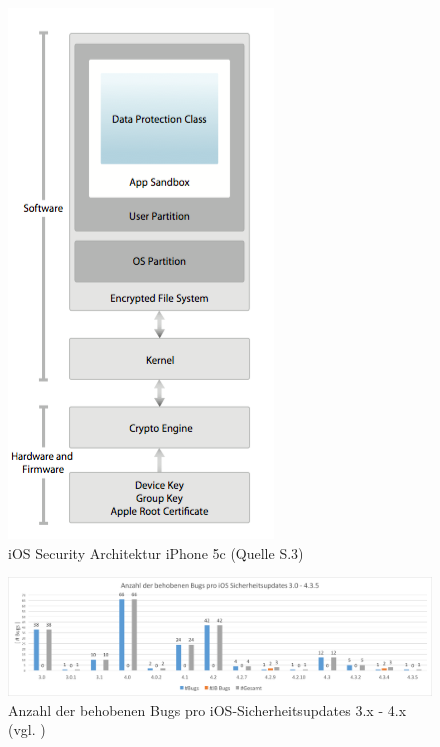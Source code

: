 \begin{figure}[htbp!]
    \centering 
		        \includegraphics[scale=0.3]{Bilder/SecArchitektur-iOS7.png}
	\caption {iOS Security Architektur iPhone 5c (Quelle \cite{Apple[9]} S.3) } 
    \label{fig:iOSSecurityArchitekturiOS7}
\end{figure}

\begin{figure}[htbp!]
        \centering
                \includegraphics[scale=0.4]{Bilder/iOSSicherheitsupdate3.png}
        \caption{Anzahl der behobenen Bugs pro iOS-Sicherheitsupdates 3.x - 4.x \newline (vgl. \cite{Apple[7]}) \protect\footnotemark}
        \label{fig:AnalyseiOSSicherheitsupdate3}
\end{figure}

